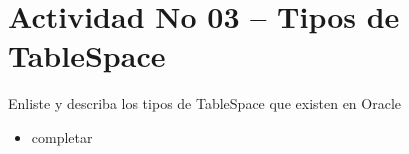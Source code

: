 \section{Actividad No 03 – Tipos de TableSpace} 
Enliste y describa los tipos de TableSpace que existen en Oracle
		
\begin{itemize}
\item completar
\end{itemize} 


